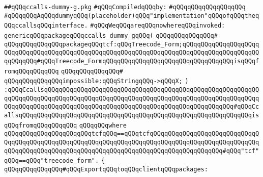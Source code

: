 \label{src/lib/compiler/back/low/ccalls/ccalls-dummy-g.pkg}
\verb|##qQQqccalls-dummy-g.pkg|\newline
\newline
\verb|#qQQqCompiledqQQqby:|\newline
\verb|#qQQqqQQqqQQqqQQqqQQq|\newline
\newline
\newline
\verb|#qQQqqQQqAqQQqdummyqQQq(placeholder)qQQq"implementation"qQQqofqQQqtheqQQqccallsqQQqinterface.|\newline
\newline
\verb|#qQQqWeqQQqareqQQqnowhereqQQqinvoked:|\newline
\newline
\verb|genericqQQqpackageqQQqccalls_dummy_gqQQq(|\newline
\verb|qQQqqQQqqQQqqQQq#|\newline
\verb|qQQqqQQqqQQqqQQqpackageqQQqtcf:qQQqTreecode_Form;qQQqqQQqqQQqqQQqqQQqqQQqqQQqqQQqqQQqqQQqqQQqqQQqqQQqqQQqqQQqqQQqqQQqqQQqqQQqqQQqqQQqqQQqqQQqqQQqqQQq#qQQqTreecode_FormqQQqqQQqqQQqqQQqqQQqqQQqqQQqqQQqqQQqisqQQqfromqQQqqQQqqQQq|\newline
\verb|qQQqqQQqqQQqqQQq#|\newline
\verb|qQQqqQQqqQQqqQQqimpossible:qQQqStringqQQq->qQQqX;|\newline
\verb|)|\newline
\verb|:qQQqCcallsqQQqqQQqqQQqqQQqqQQqqQQqqQQqqQQqqQQqqQQqqQQqqQQqqQQqqQQqqQQqqQQqqQQqqQQqqQQqqQQqqQQqqQQqqQQqqQQqqQQqqQQqqQQqqQQqqQQqqQQqqQQqqQQqqQQqqQQqqQQqqQQqqQQqqQQqqQQqqQQqqQQqqQQqqQQqqQQqqQQqqQQqqQQqqQQq#qQQqCcallsqQQqqQQqqQQqqQQqqQQqqQQqqQQqqQQqqQQqqQQqqQQqqQQqqQQqqQQqqQQqqQQqisqQQqfromqQQqqQQqqQQq|\newline
\verb|qQQqqQQqwhere|\newline
\verb|qQQqqQQqqQQqqQQqqQQqqQQqtcfqQQq==qQQqtcfqQQqqQQqqQQqqQQqqQQqqQQqqQQqqQQqqQQqqQQqqQQqqQQqqQQqqQQqqQQqqQQqqQQqqQQqqQQqqQQqqQQqqQQqqQQqqQQqqQQqqQQqqQQqqQQqqQQqqQQqqQQqqQQqqQQqqQQqqQQqqQQqqQQqqQQqqQQqqQQq#qQQq"tcf"qQQq==qQQq"treecode_form".|\newline
\verb|{|\newline
\verb|qQQqqQQqqQQqqQQq#qQQqExportqQQqtoqQQqclientqQQqpackages:|\newline
